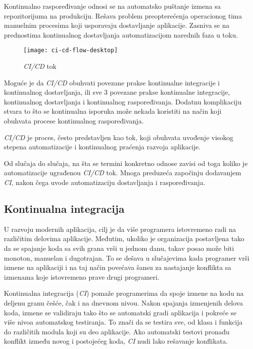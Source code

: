 Kontinualno raspoređivanje odnosi se na automatsko puštanje izmena sa repozitorijuma na produkciju. 
Rešava problem preopterećenja operacionog tima manuelnim procesima koji usporavaju dostavljanje 
aplikacije. Zasniva se na prednostima kontinualnog dostavljanja automatizacijom narednih faza u toku.

\begin{figure}[h]
    \centering
    \texttt{[image: ci-cd-flow-desktop]}
    \caption{\textit{CI/CD} tok}
\end{figure}

Moguće je da \textit{CI/CD} obuhvati povezane prakse kontinualne integracije i kontinualnog dostavljanja, 
ili sve 3 povezane prakse kontinualne integracije, kontinualnog dostavljanja i kontinualnog 
raspoređivanja. Dodatnu komplikaciju stvara to što se kontinualna isporuka može nekada koristiti 
na način koji obuhvata procese kontinualnog raspoređivanja.

\textit{CI/CD} je proces, često predstavljen kao tok, koji obuhvata uvođenje visokog stepena 
automatizacije i kontinualnog praćenja razvoja aplikacije.

Od slučaja do slučaja, na šta se termini konkretno odnose zavisi od toga koliko je automatizacije 
ugrađenou \textit{CI/CD} tok. Mnoga preduzeća započinju dodavanjem \textit{CI}, nakon čega uvode automatizaciju 
dostavljanja i raspoređivanja.

\subsection{Kontinualna integracija}
U razvoju modernih aplikacija, cilj je da više programera istovremeno radi na različitim delovima 
aplikacije. Međutim, ukoliko je organizacija postavljena tako da se spajanje koda sa svih grana 
vrši u jednom danu, takav posao može biti monoton, manuelan i dugotrajan. To se dešava u slučajevima 
kada programer vrši izmene na aplikaciji i na taj način povećava šansu za nastajanje konflikta sa 
izmenama koje istovremeno prave drugi programeri.

Kontinualna integracija (\textit{CI}) pomaže programerima da spoje izmene na kodu na deljenu granu češće, 
čak i na dnevnom nivou. Nakon spajanja izmenjenih delova koda, izmene se validiraju tako što se 
automatski gradi aplikacija i pokreće se više nivoa automatskog testiranja. To znači da se testira 
sve, od klasa i funkcija do različitih modula koji su deo aplikacije. Ako automatski testovi pronađu 
konflikt između novog i postojećeg koda, \textit{CI} nudi lako rešavanje konflikata.

